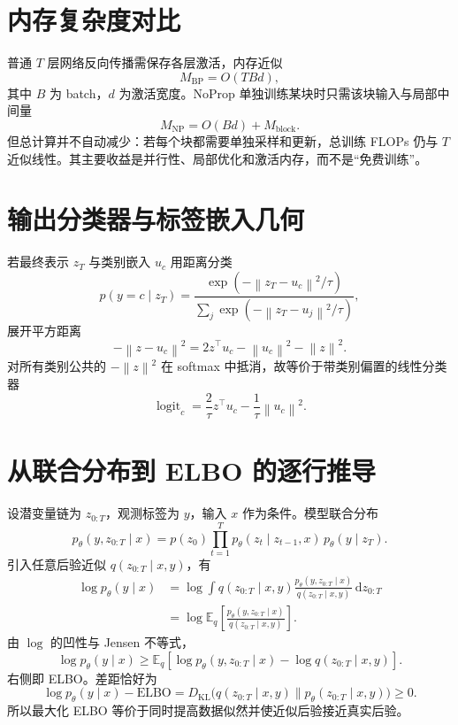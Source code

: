 \documentclass[UTF8,12pt,a4paper,fontset=none]{ctexart}
\numberwithin{equation}{section}
\newcommand{\E}{\mathbb{E}}
\newcommand{\norm}[1]{\left\lVert #1\right\rVert}
\newcommand{\KL}{D_{\mathrm{KL}}}
\newcommand{\dd}{\mathrm{d}}
\begin{document}
\section{内存复杂度对比}
普通 $T$ 层网络反向传播需保存各层激活，内存近似
\begin{equation}
 M_{\mathrm{BP}}=O(TBd),
\end{equation}
其中 $B$ 为 batch，$d$ 为激活宽度。NoProp 单独训练某块时只需该块输入与局部中间量
\begin{equation}
 M_{\mathrm{NP}}=O(Bd)+M_{\mathrm{block}}.
\end{equation}
但总计算并不自动减少：若每个块都需要单独采样和更新，总训练 FLOPs 仍与 $T$ 近似线性。其主要收益是并行性、局部优化和激活内存，而不是“免费训练”。

\section{输出分类器与标签嵌入几何}
若最终表示 $z_T$ 与类别嵌入 $u_c$ 用距离分类
\begin{equation}
 p(y=c\mid z_T)
 =\frac{\exp(-\norm{z_T-u_c}^2/\tau)}
 {\sum_j\exp(-\norm{z_T-u_j}^2/\tau)},
\end{equation}
展开平方距离
\begin{equation}
 -\norm{z-u_c}^2
 =2z^\top u_c-\norm{u_c}^2-\norm z^2.
\end{equation}
对所有类别公共的 $-\norm z^2$ 在 softmax 中抵消，故等价于带类别偏置的线性分类器
\begin{equation}
 \operatorname{logit}_c=\frac{2}{\tau}z^\top u_c-\frac1\tau\norm{u_c}^2.
\end{equation}
\clearpage
\section{从联合分布到 ELBO 的逐行推导}
设潜变量链为 $z_{0:T}$，观测标签为 $y$，输入 $x$ 作为条件。模型联合分布
\begin{equation}
 p_\theta(y,z_{0:T}\mid x)
 =p(z_0)\prod_{t=1}^{T}p_\theta(z_t\mid z_{t-1},x)\,p_\theta(y\mid z_T).
\end{equation}
引入任意后验近似 $q(z_{0:T}\mid x,y)$，有
\begin{align}
 \log p_\theta(y\mid x)
 &=\log\int q(z_{0:T}\mid x,y)
 \frac{p_\theta(y,z_{0:T}\mid x)}{q(z_{0:T}\mid x,y)}\,\dd z_{0:T}\\
 &=\log\E_q\left[
 \frac{p_\theta(y,z_{0:T}\mid x)}{q(z_{0:T}\mid x,y)}\right].
\end{align}
由 $\log$ 的凹性与 Jensen 不等式，
\begin{equation}
 \log p_\theta(y\mid x)
 \ge \E_q\left[
 \log p_\theta(y,z_{0:T}\mid x)-\log q(z_{0:T}\mid x,y)
 \right].
\end{equation}
右侧即 ELBO。差距恰好为
\begin{equation}
 \log p_\theta(y\mid x)-\mathrm{ELBO}
 =\KL\bigl(q(z_{0:T}\mid x,y)\|p_\theta(z_{0:T}\mid x,y)\bigr)\ge0.
\end{equation}
所以最大化 ELBO 等价于同时提高数据似然并使近似后验接近真实后验。
\end{document}
